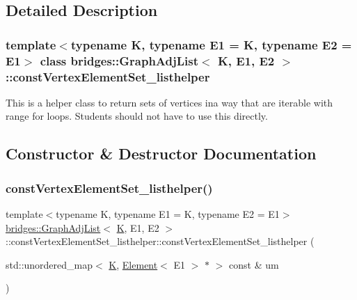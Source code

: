 \subsection{Detailed Description}
\subsubsection*{template$<$typename K, typename E1 = K, typename E2 = E1$>$\newline
class bridges\+::\+Graph\+Adj\+List$<$ K, E1, E2 $>$\+::const\+Vertex\+Element\+Set\+\_\+listhelper}

This is a helper class to return sets of vertices ina way that are iterable with range for loops. Students should not have to use this directly. 

\subsection{Constructor \& Destructor Documentation}
\mbox{\label{classbridges_1_1_graph_adj_list_1_1const_vertex_element_set__listhelper_abfaf469c4ba34510664745aa57ab81b5}} 
\subsubsection{\texorpdfstring{const\+Vertex\+Element\+Set\+\_\+listhelper()}{constVertexElementSet\_listhelper()}}
{\footnotesize\ttfamily template$<$typename K, typename E1 = K, typename E2 = E1$>$ \\
\hyperlink{classbridges_1_1_graph_adj_list}{bridges\+::\+Graph\+Adj\+List}$<$ \hyperlink{namespacebridges_acfb0a4f7877d8f63de3e6862004c50edaa5f3c6a11b03839d46af9fb43c97c188}{K}, E1, E2 $>$\+::const\+Vertex\+Element\+Set\+\_\+listhelper\+::const\+Vertex\+Element\+Set\+\_\+listhelper (\begin{DoxyParamCaption}\item[{std\+::unordered\+\_\+map$<$ \hyperlink{namespacebridges_acfb0a4f7877d8f63de3e6862004c50edaa5f3c6a11b03839d46af9fb43c97c188}{K}, \hyperlink{classbridges_1_1_element}{Element}$<$ E1 $>$ $\ast$ $>$ const \&}]{um }\end{DoxyParamCaption})\hspace{0.3cm}{\ttfamily [inline]}}




